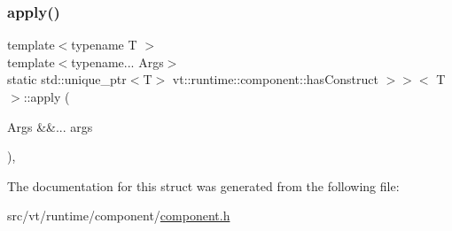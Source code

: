 \subsubsection{\texorpdfstring{apply()}{apply()}}
{\footnotesize\ttfamily template$<$typename T $>$ \\
template$<$typename... Args$>$ \\
static std\+::unique\+\_\+ptr$<$T$>$ vt\+::runtime\+::component\+::has\+Construct $>$$>$$<$ T $>$\+::apply (\begin{DoxyParamCaption}\item[{Args \&\&...}]{args }\end{DoxyParamCaption})\hspace{0.3cm}{\ttfamily [inline]}, {\ttfamily [static]}}



The documentation for this struct was generated from the following file\+:\begin{DoxyCompactItemize}
\item 
src/vt/runtime/component/\hyperlink{component_8h}{component.\+h}\end{DoxyCompactItemize}
